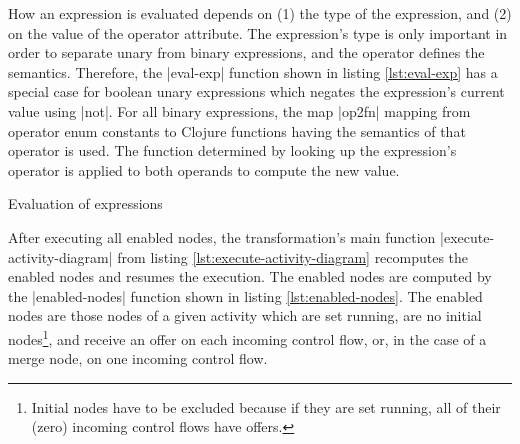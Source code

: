 \documentclass[submission]{eptcs}
\newcommand{\code}{\clojureinline}
\begin{document}
How an expression is evaluated depends on (1) the type of the expression, and
(2) on the value of the \textsf{operator} attribute.  The expression's type is
only important in order to separate unary from binary expressions, and the
operator defines the semantics.  Therefore, the \code|eval-exp| function shown
in listing \vref{lst:eval-exp} has a special case for boolean unary expressions
which negates the expression's current value using \code|not|.  For all binary
expressions, the map \code|op2fn| mapping from operator enum constants to
Clojure functions having the semantics of that operator is used.  The function
determined by looking up the expression's operator is applied to both operands
to compute the new value.

\begin{listing}[h!tb]
\caption{Evaluation of expressions}
\label{lst:eval-exp}
\end{listing}

After executing all enabled nodes, the transformation's main function
\code|execute-activity-diagram| from listing
\vref{lst:execute-activity-diagram} recomputes the enabled nodes and resumes
the execution.  The enabled nodes are computed by the \code|enabled-nodes|
function shown in listing \vref{lst:enabled-nodes}.  The enabled nodes are
those nodes of a given activity which are set running, are no initial
nodes\footnote{Initial nodes have to be excluded because if they are set
  running, all of their (zero) incoming control flows have offers.}, and
receive an offer on each incoming control flow, or, in the case of a merge
node, on one incoming control flow.
\end{document}
